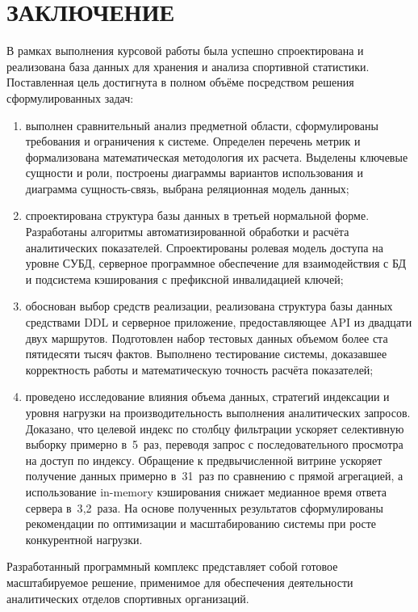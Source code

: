 \chapter*{ЗАКЛЮЧЕНИЕ}

В рамках выполнения курсовой работы была успешно спроектирована
и реализована база данных для хранения и анализа спортивной статистики.
Поставленная цель достигнута в полном объёме посредством решения
сформулированных задач:
\begin{enumerate}
    \item выполнен сравнительный анализ предметной области, сформулированы требования
          и ограничения к системе. Определен перечень метрик и формализована
          математическая методология их расчета. Выделены ключевые сущности и роли,
          построены диаграммы вариантов использования и диаграмма сущность-связь, выбрана
          реляционная модель данных;
    \item спроектирована структура базы данных в третьей нормальной форме. Разработаны
          алгоритмы автоматизированной обработки и расчёта аналитических показателей.
          Спроектированы ролевая модель доступа на уровне СУБД, серверное программное
          обеспечение для взаимодействия с БД и подсистема кэширования
          с префиксной инвалидацией ключей;
    \item обоснован выбор средств реализации, реализована структура базы данных
          средствами DDL и серверное приложение, предоставляющее API из двадцати двух
          маршрутов. Подготовлен набор тестовых данных объемом более ста пятидесяти
          тысяч фактов. Выполнено тестирование системы, доказавшее корректность
          работы и математическую точность расчёта показателей;
    \item проведено исследование влияния объема данных, стратегий индексации
          и уровня нагрузки на производительность выполнения аналитических запросов.
          Доказано, что целевой индекс по столбцу фильтрации ускоряет селективную
          выборку примерно в~5~раз, переводя запрос с последовательного просмотра
          на доступ по индексу. Обращение
          к предвычисленной витрине ускоряет получение данных примерно в~31~раз
          по сравнению с прямой агрегацией, а использование in-memory кэширования
          снижает медианное время ответа сервера в~3{,}2~раза. На основе полученных
          результатов сформулированы рекомендации по оптимизации и масштабированию
          системы при росте конкурентной нагрузки.
\end{enumerate}

Разработанный программный комплекс представляет собой готовое
масштабируемое решение, применимое для обеспечения деятельности
аналитических отделов спортивных организаций.
